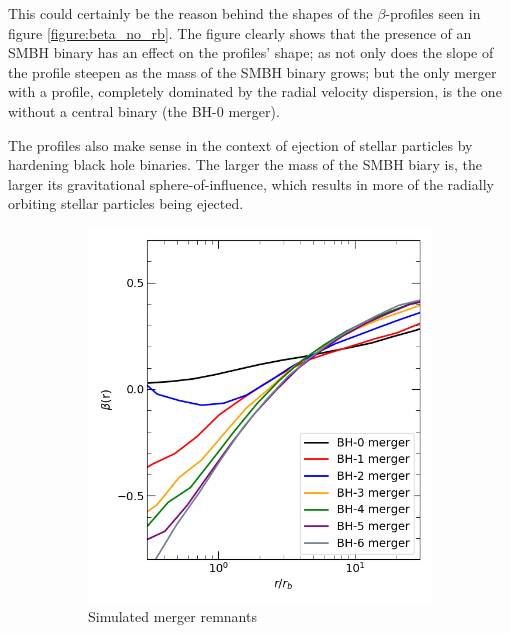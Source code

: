 \documentclass[english, oneside]{HYgradu}
\begin{document}
This could certainly be the reason behind the shapes of the $\beta$-profiles seen in figure \ref{figure:beta_no_rb}. The figure clearly shows that the presence of an SMBH binary has an effect on the profiles' shape; as not only does the slope of the profile steepen as the mass of the SMBH binary grows; but the only merger with a profile, completely dominated by the radial velocity dispersion, is the one without a central binary (the BH-0 merger). 

The profiles also make sense in the context of ejection of stellar particles by hardening black hole binaries. The larger the mass of the SMBH biary is, the larger its gravitational sphere-of-influence, which results in more of the radially orbiting stellar particles being ejected.

\begin{figure}
	\centering
	\begin{subfigure}[b]{0.39\textwidth}
		\includegraphics[width=\textwidth]{beta.png}	
		\caption{Simulated merger remnants}
	\end{subfigure}
	\begin{subfigure}[b]{0.60\textwidth}

\end{subfigure}
\end{figure}
\end{document}
